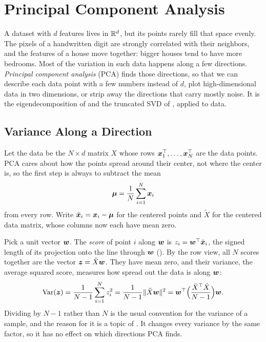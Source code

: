\section{Principal Component Analysis}
\label{sec:ch04-pca}

A dataset with $d$ features lives in $\mathbb{R}^d$, but its points rarely fill
that space evenly. The pixels of a handwritten digit are strongly
correlated with their neighbors, and the features of a house move
together: bigger houses tend to have more bedrooms. Most of the variation
in such data happens along a few directions. \emph{Principal component
analysis} (PCA) finds those directions, so that we can describe each data
point with a few numbers instead of $d$, plot high-dimensional data in two
dimensions, or strip away the directions that carry mostly noise. It is
the eigendecomposition of  and the
truncated SVD of , applied to data.

\subsection{Variance Along a Direction}
\label{sec:ch04-pca-variance}

Let the data be the $N \times d$ matrix $X$ whose rows
$\bm{x}_1^\top, \dots, \bm{x}_N^\top$ are the data points. PCA cares
about how the points spread around their center, not where the center
is, so the first step is always to subtract the mean
\[
  \bm{\mu} = \frac{1}{N} \sum_{i=1}^N \bm{x}_i
\]
from every row. Write $\tilde{\bm{x}}_i = \bm{x}_i - \bm{\mu}$ for the
centered points and $\tilde{X}$ for the centered data matrix, whose
columns now each have mean zero.

Pick a unit vector $\bm{w}$. The \emph{score} of point $i$ along
$\bm{w}$ is $z_i = \bm{w}^\top \tilde{\bm{x}}_i$, the signed length
of its projection onto the line through $\bm{w}$
(). By the row view, all $N$ scores together are
the vector $\bm{z} = \tilde{X}\bm{w}$. They have mean zero, and their
variance, the average squared score, measures how spread out the data is
along $\bm{w}$:
\begin{equation}
  \operatorname{Var}(\bm{z})
  = \frac{1}{N - 1} \sum_{i=1}^N z_i^2
  = \frac{1}{N - 1} \|\tilde{X}\bm{w}\|^2
  = \bm{w}^\top \Bigl( \frac{\tilde{X}^\top \tilde{X}}{N - 1} \Bigr)
    \bm{w} .
  \label{eq:ch04-var-direction}
\end{equation}
Dividing by $N - 1$ rather than $N$ is the usual convention for the
variance of a sample, and the reason for it is a topic of
. It changes every variance by the same factor, so it has
no effect on which directions PCA finds.

